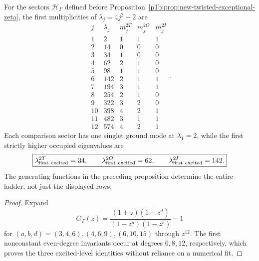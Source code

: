 \documentclass[11pt]{article}
\begin{document}
\begin{proposition}
\label{p1b:prop:v11-spinorial-low-modes}
For the sectors $\mathscr H_\Gamma$ defined before
Proposition~\ref{p1b:prop:new-twisted-exceptional-zeta}, the first
multiplicities of $\lambda_j=4j^2-2$ are
\[
\begin{array}{r|r|r|r|r}
 j&\lambda_j&m_j^{2T}&m_j^{2O}&m_j^{2I}\\\hline
 1&2&1&1&1\\
 2&14&0&0&0\\
 3&34&1&0&0\\
 4&62&2&1&0\\
 5&98&1&1&0\\
 6&142&2&1&1\\
 7&194&3&1&1\\
 8&254&2&1&0\\
 9&322&3&2&0\\
10&398&4&2&1\\
11&482&3&1&1\\
12&574&4&2&1
\end{array}.
\]
Each comparison sector has one singlet ground mode at $\lambda_1=2$,
while the first strictly higher occupied eigenvalues are
\[
\boxed{\lambda_{\rm first\ excited}^{2T}=34,\qquad
\lambda_{\rm first\ excited}^{2O}=62,\qquad
\lambda_{\rm first\ excited}^{2I}=142.}
\]
The generating functions in the preceding proposition determine the
entire ladder, not just the displayed rows.
\end{proposition}
\begin{proof}
Expand
\[
 G_\Gamma(z)=\frac{(1+z)(1+z^d)}{(1-z^a)(1-z^b)}-1
\]
for $(a,b,d)=(3,4,6),(4,6,9),(6,10,15)$ through $z^{12}$.
The first nonconstant even-degree invariants occur at degrees
$6,8,12$, respectively, which proves the three excited-level
identities without reliance on a numerical fit.
\end{proof}
\end{document}
